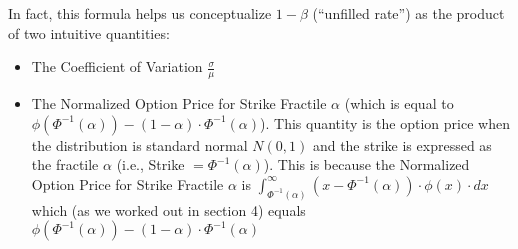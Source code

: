 \documentclass[11pt, oneside]{article}   	%
\begin{document}
In fact, this formula helps us conceptualize $1-\beta$ (``unfilled rate'') as the product of two intuitive quantities:

\begin{itemize}
\item The Coefficient of Variation $\frac {\sigma} {\mu}$
\item The Normalized Option Price for Strike Fractile $\alpha$ (which is equal to $\phi(\Phi^{-1}(\alpha)) - (1 - \alpha) \cdot \Phi^{-1}(\alpha)$). This quantity is the option price when the distribution is standard normal $N(0,1)$ and the strike is expressed as the fractile $\alpha$ (i.e., Strike $= \Phi^{-1}(\alpha)$). This is because the Normalized Option Price for Strike Fractile $\alpha$ is $\int_{\Phi^{-1}(\alpha)}^{\infty} (x - \Phi^{-1}(\alpha)) \cdot \phi(x) \cdot dx$ which (as we worked out in section 4) equals $\phi(\Phi^{-1}(\alpha)) - (1 - \alpha) \cdot \Phi^{-1}(\alpha)$
\end{itemize}
\end{document}
